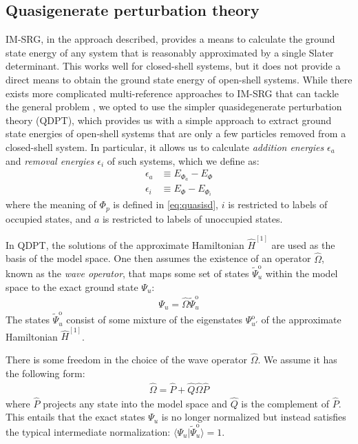 \subsection{Quasigenerate perturbation theory}
\label{subsec:selfenergy}

IM-SRG, in the approach described, provides a means to calculate the ground state energy of any system that is reasonably approximated by a single Slater determinant.  This works well for closed-shell systems, but it does not provide a direct means to obtain the ground state energy of open-shell systems.  While there exists more complicated multi-reference approaches to IM-SRG that can tackle the general problem \cite{Hergert2016165}, we opted to use the simpler quasidegenerate perturbation theory (QDPT), which provides us with a simple approach to extract ground state energies of open-shell systems that are only a few particles removed from a closed-shell system.  In particular, it allows us to calculate \textit{addition energies} $\epsilon_a$ and \textit{removal energies} $\epsilon_i$ of such systems, which we define as:
\begin{align}
  \epsilon_a &\equiv E_{\Phi_a} - E_{\Phi} \\
  \epsilon_i &\equiv E_{\Phi} - E_{\Phi_i}
\end{align}
where the meaning of $\Phi_p$ is defined in \eqref{eq:quasisd}, $i$ is restricted to labels of occupied states, and $a$ is restricted to labels of unoccupied states.

In QDPT, the solutions of the approximate Hamiltonian $\hat{H}^{[1]}$ are used as the basis of the model space.  One then assumes the existence of an operator $\hat \Omega$, known as the \textit{wave operator}, that maps some set of states $\tilde \Psi^{\mathrm{o}}_u$ within the model space to the exact ground state $\Psi_u$:
\begin{align} \label{eq:omega-condition1}
  \Psi_u = \hat \Omega \tilde \Psi^{\mathrm{o}}_u
\end{align}
The states $\tilde \Psi^{\mathrm{o}}_u$ consist of some mixture of the eigenstates
$\Psi^{\mathrm{o}}_{u'}$ of the approximate Hamiltonian $\hat{H}^{[1]}$.

There is some freedom in the choice of the wave operator $\hat \Omega$.  We
assume it has the following form:
\begin{align} \label{eq:omega-condition2}
  \hat \Omega = \hat P + \hat Q \hat \Omega \hat P
\end{align}
where $\hat P$ projects any state into the model space and $\hat Q$ is the
complement of $\hat P$.  This entails that the exact states $\Psi_u$ is no
longer normalized but instead satisfies the typical intermediate
normalization: $\langle \Psi_u | \tilde \Psi^{\mathrm{o}}_u \rangle = 1$.

